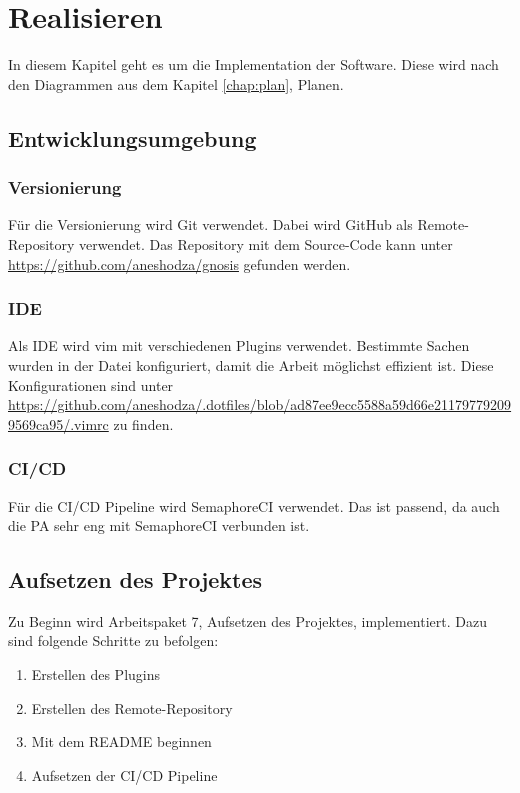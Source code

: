 \chapter{Realisieren}
In diesem Kapitel geht es um die Implementation der Software. Diese wird nach den Diagrammen aus dem Kapitel
\ref{chap:plan}, Planen.

\section{Entwicklungsumgebung}
\subsection{Versionierung}
Für die Versionierung wird Git verwendet. Dabei wird GitHub als Remote-Repository verwendet. Das Repository mit
dem Source-Code kann unter \url{https://github.com/aneshodza/gnosis} gefunden werden.
\subsection{IDE}
Als IDE wird vim mit verschiedenen Plugins verwendet. Bestimmte Sachen wurden in der  Datei
konfiguriert, damit die Arbeit möglichst effizient ist. \newline
Diese Konfigurationen sind unter \newline
\url{https://github.com/aneshodza/.dotfiles/blob/ad87ee9ecc5588a59d66e211797792099569ca95/.vimrc} zu finden.
\subsection{CI/CD}
Für die CI/CD Pipeline wird SemaphoreCI verwendet. Das ist passend, da auch die PA sehr eng mit SemaphoreCI verbunden
ist.

\section{Aufsetzen des Projektes}
Zu Beginn wird Arbeitspaket 7, Aufsetzen des Projektes, implementiert. Dazu sind folgende Schritte zu befolgen:
\begin{enumerate}
  \item Erstellen des Plugins
  \item Erstellen des Remote-Repository
  \item Mit dem README beginnen
  \item Aufsetzen der CI/CD Pipeline
\end{enumerate}

